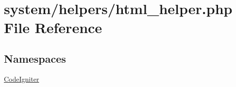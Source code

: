 \hypertarget{html__helper_8php}{}\section{system/helpers/html\+\_\+helper.php File Reference}
\label{html__helper_8php}
\subsection*{Namespaces}
\begin{DoxyCompactItemize}
\item 
 \mbox{\hyperlink{namespace_code_igniter}{Code\+Igniter}}
\end{DoxyCompactItemize}
